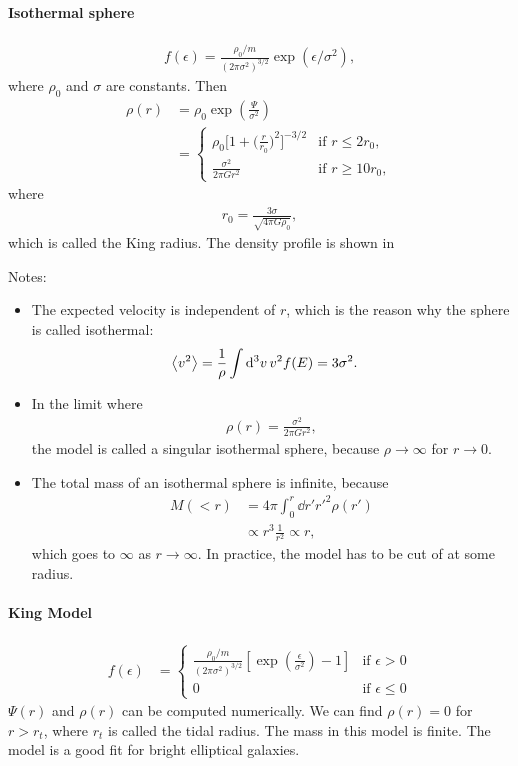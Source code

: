 \paragraph*{Isothermal sphere}
\begin{align*}
	f(\epsilon)
	= \frac{\rho_0/m}{(2\pi\sigma^2)^{3/2}} \exp(\epsilon/\sigma^2),
\end{align*}
where $\rho_0$ and $\sigma$ are constants. Then
\begin{align*}
	\rho(r) 
	&= \rho_0 \exp\left( \frac{\Psi}{\sigma^2} \right)\\
	&=
	\begin{cases}
		\rho_0   \Big[ 1 + \Big( \frac{r}{r_0} \Big)^2 \Big]^{-3/2}
		& \text{if } r \leq 2 r_0,\\
		\frac{\sigma^2}{2\pi G r^2}
		& \text{if } r \geq 10 r_0,
	\end{cases}
\end{align*}
where
\begin{align*}
	r_0 = \frac{3\sigma}{\sqrt{4\pi G \rho_0}},
\end{align*}
which is called the King radius.
The density profile is shown in %

Notes:
\begin{itemize}
	\item The expected velocity is independent of $r$, which is the reason why the sphere is called isothermal:
	\begin{align*}
		\left\langle v^2 \right\rangle
		&= \frac{1}{\rho} \int \dd{^3v} v^2 f(E)
		= 3 \sigma^2.
	\end{align*}
	\item In the limit where
	\begin{align*}
		\rho(r) = \frac{\sigma^2}{2 \pi G r^2},
	\end{align*}
	the model is called a singular isothermal sphere, because $\rho\to\infty$ for $r \to 0$.
	\item The total mass of an isothermal sphere is infinite, because
	\begin{align*}
		M(<r)
		&= 4 \pi \int_0^r \dd{r'} {r'}^2 \rho(r')\\
		&\propto r^3 \frac{1}{r^2} \propto r,
	\end{align*}
	which goes to $\infty$ as $r \to \infty$. In practice, the model has to be cut of at some radius.
\end{itemize}


\paragraph*{King Model}
\begin{align*}
	f(\epsilon)
	&=
	\begin{cases}
		\frac{\rho_0/m}{(2 \pi \sigma^2)^{3/2}} \left[ \exp\left( \frac{\epsilon}{\sigma^2} \right) -1 \right]
		& \text{if } \epsilon > 0\\
		0
		& \text{if } \epsilon \leq 0
	\end{cases}
\end{align*}
$\Psi(r)$ and $\rho(r)$ can be computed numerically.
We can find $\rho(r) = 0$ for $r > r_t$, where $r_t$ is called the tidal radius.
The mass in this model is finite.
The model is a good fit for bright elliptical galaxies.


